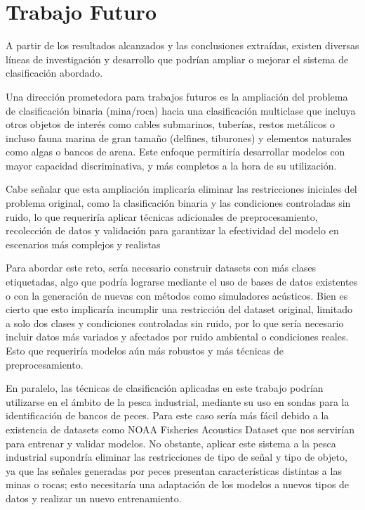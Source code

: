 \documentclass[a4paper,10pt]{article}
\begin{document}
\newpage
\section{Trabajo Futuro}
A partir de los resultados alcanzados y las conclusiones extraídas, existen diversas líneas de investigación y desarrollo que podrían ampliar o mejorar el sistema de clasificación abordado.

Una dirección prometedora para trabajos futuros es la ampliación del problema de clasificación binaria (mina/roca) hacia una clasificación multiclase que incluya otros objetos de interés como cables submarinos, tuberías, restos metálicos o incluso fauna marina de gran tamaño (delfines, tiburones) y elementos naturales como algas o bancos de arena. Este enfoque permitiría desarrollar modelos con mayor capacidad discriminativa, y más completos a la hora de su utilización. 

Cabe señalar que esta ampliación implicaría eliminar las restricciones iniciales del problema original, como la clasificación binaria y las condiciones controladas sin ruido, lo que requeriría aplicar técnicas adicionales de preprocesamiento, recolección de datos y validación para garantizar la efectividad del modelo en escenarios más complejos y realistas

Para abordar este reto, sería necesario construir datasets con más clases etiquetadas, algo que podría lograrse mediante el uso de bases de datos existentes o con la generación de nuevas con métodos como simuladores acústicos. Bien es cierto que esto implicaría incumplir una restricción del dataset original, limitado a solo dos clases y condiciones controladas sin ruido, por lo que sería necesario incluir datos más variados y afectados por ruido ambiental o condiciones reales. Esto que requeriría modelos aún más robustos y más técnicas de preprocesamiento.

En paralelo, las técnicas de clasificación aplicadas en este trabajo podrían utilizarse en el ámbito de la pesca industrial, mediante su uso en sondas para la identificación de bancos de peces. Para este caso sería más fácil debido a la existencia de datasets como NOAA Fisheries Acoustics Dataset\cite{noaa_fisheries} que nos servirían para entrenar y validar modelos. No obstante, aplicar este sistema a la pesca industrial supondría eliminar las restricciones de tipo de señal y tipo de objeto, ya que las señales generadas por peces presentan características distintas a las minas o rocas; esto necesitaría una adaptación de los modelos a nuevos tipos de datos y realizar un nuevo entrenamiento. 
\end{document}
